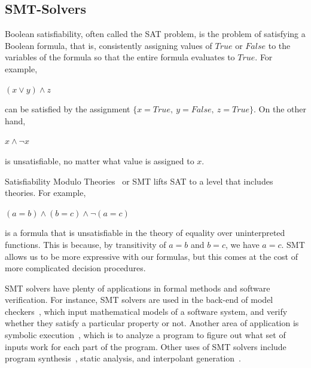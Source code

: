 \documentclass{article}
\begin{document}
\subsection{SMT-Solvers}
\label{smt}
	Boolean satisfiability, often called the SAT problem, 
	is the problem of satisfying a Boolean formula, that is, 
	consistently assigning values of $True$ or $False$ 
	to the variables of the formula so that the entire 
	formula evaluates to $True$. For example,
	\begin{center}$(x \lor y) \land z$ \end{center}
	can be satisfied by the 
	assignment $\{x=True,\ y=False,\ z=True\}$. On the other hand, 
	\begin{center} $x \land \neg x$ \end{center}
	is unsatisfiable, no matter what value is assigned to $x$.
	
	Satisfiability Modulo Theories~\cite{DBLP:reference/mc/BarrettT18} 
	or SMT lifts SAT to a level that includes theories. 
	For example, 
	\begin{center} $(a = b) \land (b = c) \land \neg (a = c)$ 
	\end{center}
	is a formula that is unsatisfiable in the theory of 
	equality over uninterpreted functions. This is because, by
	transitivity of $a = b$ and $b = c$, we have $a = c$. SMT 
	allows us to be more expressive with our formulas, but 
	this comes at the cost of more complicated decision 
	procedures.
	
	SMT solvers have plenty of applications in formal methods 
	and software verification. For instance, SMT solvers are used 
	in the back-end of model checkers~\cite{DBLP:books/daglib/0020348}, 
	which input mathematical 
	models of a software system, and verify whether they 
	satisfy a particular property or not. Another area of 
	application is symbolic
	execution~\cite{DBLP:journals/csur/BaldoniCDDF18}, 
	which is to analyze a 
	program to figure out what set of inputs work for each 
	part of the program. Other uses of SMT solvers include 
	program synthesis~\cite{synth}, static analysis, 
	and interpolant generation~\cite{DBLP:journals/corr/abs-1111-5652}.
	
\end{document}
